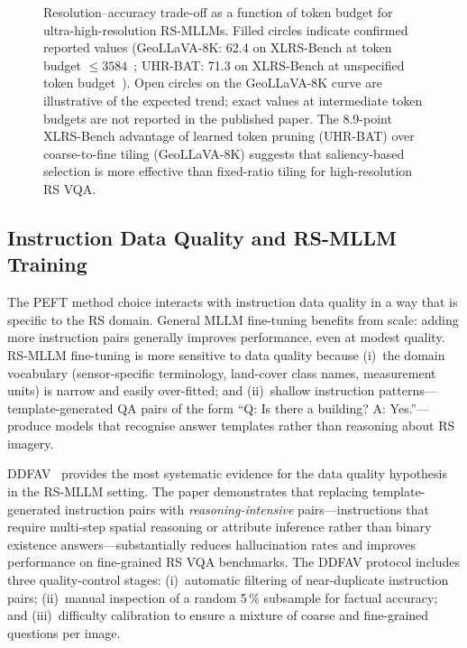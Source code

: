 \begin{figure}[h]
\begin{tikzpicture}[font=\small, >=Stealth]
\end{tikzpicture}
\caption{Resolution--accuracy trade-off as a function of token budget
for ultra-high-resolution RS-MLLMs. Filled circles indicate confirmed
reported values (GeoLLaVA-8K: 62.4 on XLRS-Bench at token budget
$\leq\!3584$~\cite{geollava2025}; UHR-BAT: 71.3 on XLRS-Bench at
unspecified token budget~\cite{uhrbat2025}). Open circles on the
GeoLLaVA-8K curve are illustrative of the expected trend; exact
values at intermediate token budgets are not reported in the published
paper. The 8.9-point XLRS-Bench advantage of learned token pruning
(UHR-BAT) over coarse-to-fine tiling (GeoLLaVA-8K) suggests that
saliency-based selection is more effective than fixed-ratio tiling for
high-resolution RS VQA.}\label{fig:token_tradeoff}
\end{figure}

\subsection{Instruction Data Quality and RS-MLLM Training}\label{sec6:dataqual}

The PEFT method choice interacts with instruction data quality in a way
that is specific to the RS domain. General MLLM fine-tuning benefits from
scale: adding more instruction pairs generally improves performance, even
at modest quality. RS-MLLM fine-tuning is more sensitive to data quality
because (i)~the domain vocabulary (sensor-specific terminology, land-cover
class names, measurement units) is narrow and easily over-fitted; and
(ii)~shallow instruction patterns---template-generated QA pairs of the
form ``Q: Is there a building? A: Yes.''---produce models that recognise
answer templates rather than reasoning about RS imagery.

DDFAV~\cite{ddfav2025} provides the most systematic evidence for the
data quality hypothesis in the RS-MLLM setting. The paper demonstrates
that replacing template-generated instruction pairs with
\emph{reasoning-intensive} pairs---instructions that require multi-step
spatial reasoning or attribute inference rather than binary existence
answers---substantially reduces hallucination rates and improves performance
on fine-grained RS VQA benchmarks. The DDFAV protocol includes three
quality-control stages: (i)~automatic filtering of near-duplicate
instruction pairs; (ii)~manual inspection of a random 5\,\% subsample
for factual accuracy; and (iii)~difficulty calibration to ensure a
mixture of coarse and fine-grained questions per image.

